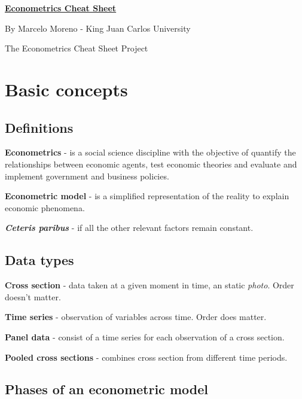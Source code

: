 \documentclass[10pt, a4paper, landscape]{extarticle}
\begin{document}
\setlength{\footskip}{12pt}

\begin{multicols}{3}

\begin{center}
	\textbf{\LARGE \href{https://github.com/marcelomijas/econometrics-cheatsheet}{Econometrics Cheat Sheet}}
	
	{\footnotesize By Marcelo Moreno - King Juan Carlos University}
	
	{\footnotesize The Econometrics Cheat Sheet Project}
\end{center}

\section*{Basic concepts}

\subsection*{Definitions}

\textbf{Econometrics} - is a social science discipline with the objective of quantify the relationships between economic agents, test economic theories and evaluate and implement government and business policies.

\textbf{Econometric model} - is a simplified representation of the reality to explain economic phenomena.

\textbf{\textsl{Ceteris paribus}} - if all the other relevant factors remain constant.

\subsection*{Data types}

\textbf{Cross section} - data taken at a given moment in time, an static \textsl{photo}. Order doesn't matter.

\textbf{Time series} - observation of variables across time. Order does matter.

\textbf{Panel data} - consist of a time series for each observation of a cross section.

\textbf{Pooled cross sections} - combines cross section from different time periods.

\subsection*{Phases of an econometric model}


\end{multicols}
\end{document}
